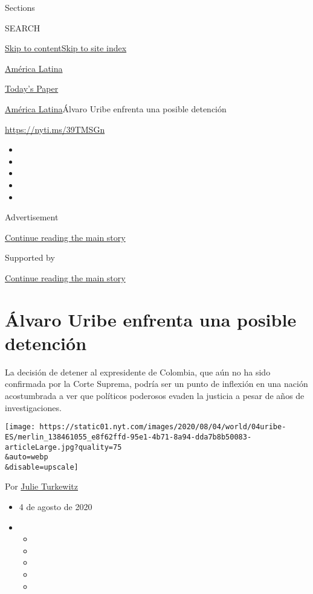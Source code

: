 Sections

SEARCH

\protect\hyperlink{site-content}{Skip to
content}\protect\hyperlink{site-index}{Skip to site index}

\href{https://www.nytimes.com/es/section/america-latina}{América Latina}

\href{https://myaccount.nytimes.com/auth/login?response_type=cookie\&client_id=vi}{}

\href{https://www.nytimes.com/section/todayspaper}{Today's Paper}

\href{/es/section/america-latina}{América Latina}\textbar{}Álvaro Uribe
enfrenta una posible detención

\url{https://nyti.ms/39TMSGn}

\begin{itemize}
\item
\item
\item
\item
\item
\end{itemize}

Advertisement

\protect\hyperlink{after-top}{Continue reading the main story}

Supported by

\protect\hyperlink{after-sponsor}{Continue reading the main story}

\hypertarget{uxe1lvaro-uribe-enfrenta-una-posible-detenciuxf3n}{%
\section{Álvaro Uribe enfrenta una posible
detención}\label{uxe1lvaro-uribe-enfrenta-una-posible-detenciuxf3n}}

La decisión de detener al expresidente de Colombia, que aún no ha sido
confirmada por la Corte Suprema, podría ser un punto de inflexión en una
nación acostumbrada a ver que políticos poderosos evaden la justicia a
pesar de años de investigaciones.

\texttt{[image: https://static01.nyt.com/images/2020/08/04/world/04uribe-ES/merlin\_138461055\_e8f62ffd-95e1-4b71-8a94-dda7b8b50083-articleLarge.jpg?quality=75\\\&auto=webp\\\&disable=upscale]}

Por \href{https://www.nytimes.com/by/julie-turkewitz}{Julie Turkewitz}

\begin{itemize}
\item
  4 de agosto de 2020
\item
  \begin{itemize}
  \item
  \item
  \item
  \item
  \item
  \end{itemize}
\end{itemize}

